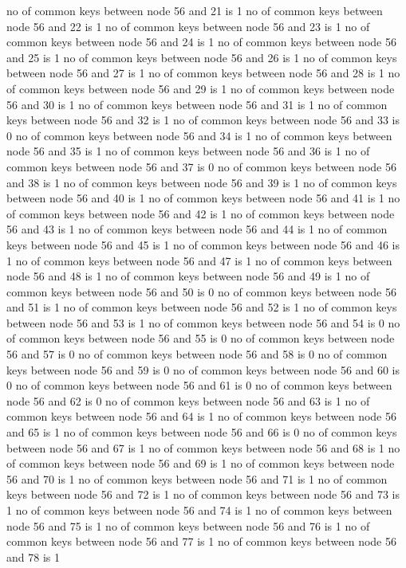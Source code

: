no of common keys between node 56 and 21 is 1
no of common keys between node 56 and 22 is 1
no of common keys between node 56 and 23 is 1
no of common keys between node 56 and 24 is 1
no of common keys between node 56 and 25 is 1
no of common keys between node 56 and 26 is 1
no of common keys between node 56 and 27 is 1
no of common keys between node 56 and 28 is 1
no of common keys between node 56 and 29 is 1
no of common keys between node 56 and 30 is 1
no of common keys between node 56 and 31 is 1
no of common keys between node 56 and 32 is 1
no of common keys between node 56 and 33 is 0
no of common keys between node 56 and 34 is 1
no of common keys between node 56 and 35 is 1
no of common keys between node 56 and 36 is 1
no of common keys between node 56 and 37 is 0
no of common keys between node 56 and 38 is 1
no of common keys between node 56 and 39 is 1
no of common keys between node 56 and 40 is 1
no of common keys between node 56 and 41 is 1
no of common keys between node 56 and 42 is 1
no of common keys between node 56 and 43 is 1
no of common keys between node 56 and 44 is 1
no of common keys between node 56 and 45 is 1
no of common keys between node 56 and 46 is 1
no of common keys between node 56 and 47 is 1
no of common keys between node 56 and 48 is 1
no of common keys between node 56 and 49 is 1
no of common keys between node 56 and 50 is 0
no of common keys between node 56 and 51 is 1
no of common keys between node 56 and 52 is 1
no of common keys between node 56 and 53 is 1
no of common keys between node 56 and 54 is 0
no of common keys between node 56 and 55 is 0
no of common keys between node 56 and 57 is 0
no of common keys between node 56 and 58 is 0
no of common keys between node 56 and 59 is 0
no of common keys between node 56 and 60 is 0
no of common keys between node 56 and 61 is 0
no of common keys between node 56 and 62 is 0
no of common keys between node 56 and 63 is 1
no of common keys between node 56 and 64 is 1
no of common keys between node 56 and 65 is 1
no of common keys between node 56 and 66 is 0
no of common keys between node 56 and 67 is 1
no of common keys between node 56 and 68 is 1
no of common keys between node 56 and 69 is 1
no of common keys between node 56 and 70 is 1
no of common keys between node 56 and 71 is 1
no of common keys between node 56 and 72 is 1
no of common keys between node 56 and 73 is 1
no of common keys between node 56 and 74 is 1
no of common keys between node 56 and 75 is 1
no of common keys between node 56 and 76 is 1
no of common keys between node 56 and 77 is 1
no of common keys between node 56 and 78 is 1
